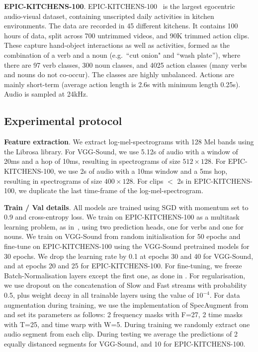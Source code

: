 \documentclass{article}
\begin{document}
\noindent\textbf{EPIC-KITCHENS-100}. EPIC-KITCHENS-100~\cite{Damen2020RESCALING} is the largest egocentric audio-visual dataset, containing unscripted daily activities in kitchen environments. The data are recorded in 45 different kitchens. It contains 100 hours of data, split across 700 untrimmed videos, and 90K trimmed action clips. These capture hand-object interactions as well as activities, formed as the combination of a verb and a noun (e.g.\ ``cut onion" and ``wash plate''), where there are 97 verb classes, 300 noun classes, and 4025 action classes (many verbs and nouns do not co-occur). The classes are highly unbalanced. Actions are mainly short-term (average action length is 2.6s with minimum length 0.25s). Audio is sampled at 24kHz. 




\subsection{Experimental protocol}
\label{subsec:protocol}

\textbf{Feature extraction}.
We extract log-mel-spectrograms with 128 Mel bands using the Librosa library. For VGG-Sound, we use 5.12s of audio with a window of 20ms and a hop of 10ms, resulting in spectrograms of size $512\times 128$. For EPIC-KITCHENS-100, we use 2s of audio with a 10ms window and a 5ms hop, resulting in spectrograms of size $400\times 128$. For clips $<$ 2s in EPIC-KITCHENS-100, we duplicate the last time-frame of the log-mel-spectrogram.

\noindent\textbf{Train / Val details}. All models are trained using SGD with momentum set to 0.9 and cross-entropy loss. We train on EPIC-KITCHENS-100 as a multitask learning problem, as in~\cite{Damen2020RESCALING}, using two prediction heads, one for verbs and one for nouns. We train on VGG-Sound from random initialisation for 50 epochs and fine-tune on EPIC-KITCHENS-100 using the VGG-Sound pretrained models for 30 epochs. We drop the learning rate by 0.1 at epochs 30 and 40 for VGG-Sound, and at epochs 20 and 25 for EPIC-KITCHENS-100. For fine-tuning, we freeze Batch-Normalisation layers except the first one, as done in \cite{TSN2016ECCV}. For regularisation, we use dropout on the concatenation of Slow and Fast streams with probability 0.5, plus weight decay in all trainable layers using the value of $10^{-4}$. For data augmentation during training, we use the implementation of SpecAugment \cite{Park2019} from \cite{specaugment_repo} and set its parameters as follows: 2 frequency masks with F=27, 2 time masks with T=25, and time warp with W=5. During training we randomly extract one audio segment from each clip. During testing we average the predictions of 2 equally distanced segments for VGG-Sound, and 10 for EPIC-KITCHENS-100.
\end{document}

